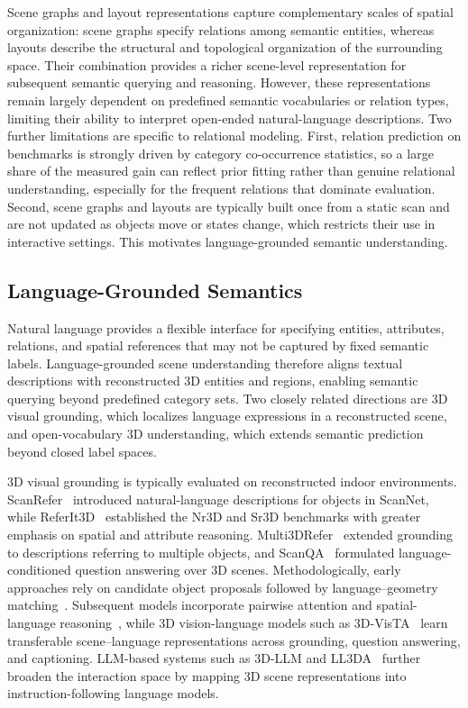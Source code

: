 \documentclass{SCIS2026}
\begin{document}
Scene graphs and layout representations capture complementary scales of spatial organization: scene graphs specify relations among semantic entities, whereas layouts describe the structural and topological organization of the surrounding space. Their combination provides a richer scene-level representation for subsequent semantic querying and reasoning. However, these representations remain largely dependent on predefined semantic vocabularies or relation types, limiting their ability to interpret open-ended natural-language descriptions. Two further limitations are specific to relational modeling. First, relation prediction on benchmarks is strongly driven by category co-occurrence statistics, so a large share of the measured gain can reflect prior fitting rather than genuine relational understanding, especially for the frequent relations that dominate evaluation. Second, scene graphs and layouts are typically built once from a static scan and are not updated as objects move or states change, which restricts their use in interactive settings. This motivates language-grounded semantic understanding.

\subsection{Language-Grounded Semantics}
Natural language provides a flexible interface for specifying entities, attributes, relations, and spatial references that may not be captured by fixed semantic labels. Language-grounded scene understanding therefore aligns textual descriptions with reconstructed 3D entities and regions, enabling semantic querying beyond predefined category sets. Two closely related directions are 3D visual grounding, which localizes language expressions in a reconstructed scene, and open-vocabulary 3D understanding, which extends semantic prediction beyond closed label spaces.

3D visual grounding is typically evaluated on reconstructed indoor environments. ScanRefer~\cite{chen2020scanrefer} introduced natural-language descriptions for objects in ScanNet, while ReferIt3D~\cite{achlioptas2020referit3d} established the Nr3D and Sr3D benchmarks with greater emphasis on spatial and attribute reasoning. Multi3DRefer~\cite{zhang2023multi3drefer} extended grounding to descriptions referring to multiple objects, and ScanQA~\cite{azuma2022scanqa} formulated language-conditioned question answering over 3D scenes. Methodologically, early approaches rely on candidate object proposals followed by language--geometry matching~\cite{chen2020scanrefer,yuan2021instancerefer}. Subsequent models incorporate pairwise attention and spatial-language reasoning~\cite{zhao20213dvgtransformer,roh2021languagerefer}, while 3D vision-language models such as 3D-VisTA~\cite{zhu20233dvista} learn transferable scene--language representations across grounding, question answering, and captioning. LLM-based systems such as 3D-LLM and LL3DA~\cite{hong20233dllm,chen2024ll3da} further broaden the interaction space by mapping 3D scene representations into instruction-following language models.
\end{document}
